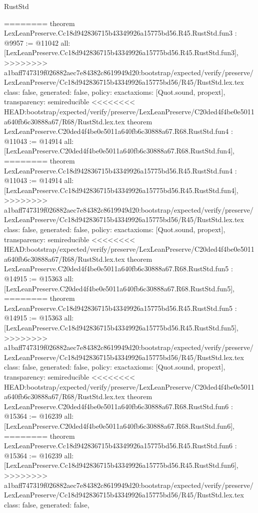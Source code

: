 \begin{lexlean}{RustStd}
\begin{coremodule}
{\begin{coremodule}
{{{{{{========
theorem LexLeanPreserve.Cc18d942836715b43349926a15775bd56.R45.RustStd.fun3 : @9957 := @11042 {
  all: [LexLeanPreserve.Cc18d942836715b43349926a15775bd56.R45.RustStd.fun3],
>>>>>>>> a1baff747319f026882aec7e84382c8619949d20:bootstrap/expected/verify/preserve/LexLeanPreserve/Cc18d942836715b43349926a15775bd56/R45/RustStd.lex.tex
  class: false,
  generated: false,
  policy: exact{axioms: [Quot.sound, propext]},
  transparency: semireducible
}
<<<<<<<< HEAD:bootstrap/expected/verify/preserve/LexLeanPreserve/C20ded4f4be0e5011a640fb6c30888a67/R68/RustStd.lex.tex
theorem LexLeanPreserve.C20ded4f4be0e5011a640fb6c30888a67.R68.RustStd.fun4 : @11043 := @14914 {
  all: [LexLeanPreserve.C20ded4f4be0e5011a640fb6c30888a67.R68.RustStd.fun4],
========
theorem LexLeanPreserve.Cc18d942836715b43349926a15775bd56.R45.RustStd.fun4 : @11043 := @14914 {
  all: [LexLeanPreserve.Cc18d942836715b43349926a15775bd56.R45.RustStd.fun4],
>>>>>>>> a1baff747319f026882aec7e84382c8619949d20:bootstrap/expected/verify/preserve/LexLeanPreserve/Cc18d942836715b43349926a15775bd56/R45/RustStd.lex.tex
  class: false,
  generated: false,
  policy: exact{axioms: [Quot.sound, propext]},
  transparency: semireducible
}
<<<<<<<< HEAD:bootstrap/expected/verify/preserve/LexLeanPreserve/C20ded4f4be0e5011a640fb6c30888a67/R68/RustStd.lex.tex
theorem LexLeanPreserve.C20ded4f4be0e5011a640fb6c30888a67.R68.RustStd.fun5 : @14915 := @15363 {
  all: [LexLeanPreserve.C20ded4f4be0e5011a640fb6c30888a67.R68.RustStd.fun5],
========
theorem LexLeanPreserve.Cc18d942836715b43349926a15775bd56.R45.RustStd.fun5 : @14915 := @15363 {
  all: [LexLeanPreserve.Cc18d942836715b43349926a15775bd56.R45.RustStd.fun5],
>>>>>>>> a1baff747319f026882aec7e84382c8619949d20:bootstrap/expected/verify/preserve/LexLeanPreserve/Cc18d942836715b43349926a15775bd56/R45/RustStd.lex.tex
  class: false,
  generated: false,
  policy: exact{axioms: [Quot.sound, propext]},
  transparency: semireducible
}
<<<<<<<< HEAD:bootstrap/expected/verify/preserve/LexLeanPreserve/C20ded4f4be0e5011a640fb6c30888a67/R68/RustStd.lex.tex
theorem LexLeanPreserve.C20ded4f4be0e5011a640fb6c30888a67.R68.RustStd.fun6 : @15364 := @16239 {
  all: [LexLeanPreserve.C20ded4f4be0e5011a640fb6c30888a67.R68.RustStd.fun6],
========
theorem LexLeanPreserve.Cc18d942836715b43349926a15775bd56.R45.RustStd.fun6 : @15364 := @16239 {
  all: [LexLeanPreserve.Cc18d942836715b43349926a15775bd56.R45.RustStd.fun6],
>>>>>>>> a1baff747319f026882aec7e84382c8619949d20:bootstrap/expected/verify/preserve/LexLeanPreserve/Cc18d942836715b43349926a15775bd56/R45/RustStd.lex.tex
  class: false,
  generated: false,
}}}}}}}}}}
\end{coremodule}}
\end{coremodule}
\end{lexlean}
